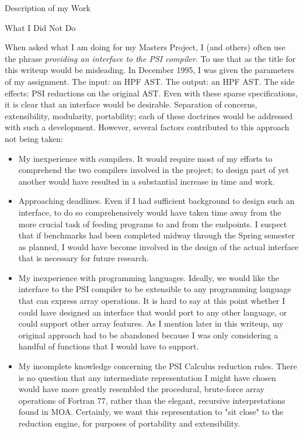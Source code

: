 Description of my Work

What I Did Not Do

When asked what I am doing for my Masters Project, I (and others)
often use the phrase {\it providing an interface to the PSI compiler}.
To use that as the title for this writeup would be misleading.  In
December 1995, I was given the parameters of my assignment.  The
input:  an HPF AST.  The output:  an HPF AST.  The side effects:  PSI
reductions on the original AST.  Even with these sparse specifications,
it is clear that an interface would be desirable.  Separation of
concerns, extensibility, modularity, portability; each of these
doctrines would be addressed with such a development.  However, several
factors contributed to this approach not being taken:\\

\begin{itemize}
\item  My inexperience with compilers.  It would require most of my efforts to
comprehend the two compilers involved in the project; to design part of yet
another would have resulted in a substantial increase in time and work.\\

\item  Approaching deadlines.  Even if I had sufficient background to design
such an interface, to do so comprehensively would have taken time away
from the more crucial task of feeding programs to and from the endpoints.
I suspect that if benchmarks had been completed midway through the Spring
semester as planned, I would have become involved in the design of the
actual interface that is necessary for future research.\\

\item  My inexperience with programming languages.  Ideally, we would like
the interface to the PSI compiler to be extensible to any programming
language that can express array operations.  It is hard to say at this
point whether I could have designed an interface that would port to any
other language, or could support other array features.  As I mention
later in this writeup, my original approach had to be abandoned because
I was only considering a handful of functions that I would have to
support.\\

\item  My incomplete knowledge concerning the PSI Calculus reduction rules.
There is no question that any intermediate representation I might have
chosen would have more greatly resembled the procedural, brute-force
array operations of Fortran 77, rather than the elegant, recursive
interpretations found in MOA.  Certainly, we want this representation
to "sit close" to the reduction engine, for purposes of portability
and extensibility.\\
\end{itemize}


